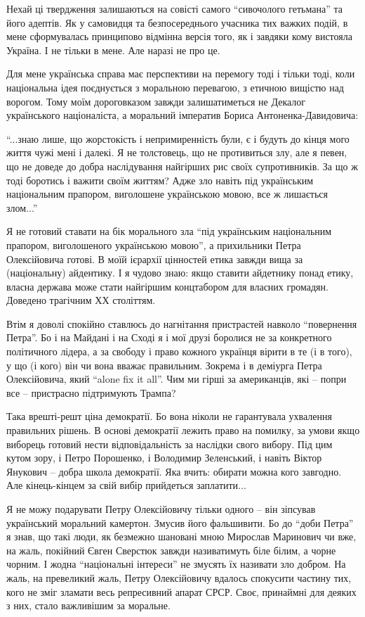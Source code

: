 Нехай ці твердження залишаються на совісті самого \enquote{сивочолого гетьмана}
та його адептів. Як у самовидця та безпосереднього учасника тих важких подій, в
мене сформувалась принципово відмінна версія того, як і завдяки кому вистояла
Україна. І не тільки в мене. Але наразі не про це.

Для мене українська справа має перспективи на перемогу тоді і тільки тоді, коли
національна ідея поєднується з моральною перевагою, з етичною вищістю над
ворогом. Тому моїм дороговказом завжди залишатиметься не Декалог українського
націоналіста, а моральний імператив Бориса Антоненка-Давидовича:

\begin{zzquote}
\enquote{...знаю лише, що жорстокість і непримиренність були, є і будуть до кінця мого
життя чужі мені і далекі. Я не толстовець, що не противиться злу, але я певен,
що не доведе до добра наслідування найгірших рис своїх супротивників. За що ж
тоді боротись і важити своїм життям? Адже зло навіть під українським
національним прапором, виголошене українською мовою, все ж лишається злом...}
\end{zzquote}

Я не готовий ставати на бік морального зла \enquote{під українським національним
прапором, виголошеного українською мовою}, а прихильники Петра Олексійовича
готові. В моїй ієрархії цінностей етика завжди вища за (національну) айдентику.
І я чудово знаю: якщо ставити айдетнику понад етику, власна держава може стати
найгіршим концтабором для власних громадян. Доведено трагічним ХХ століттям.

Втім я доволі спокійно ставлюсь до нагнітання пристрастей навколо
\enquote{повернення Петра}. Бо і на Майдані і на Сході я і мої друзі боролися
не за конкретного політичного лідера, а за свободу і право кожного українця
вірити в те (і в того), у що (і кого) він чи вона вважає правильним. Зокрема і
в деміурга Петра Олексійовича, який \enquote{alone fix it all}. Чим ми гірші за
американців, які – попри все – пристрасно підтримують Трампа?

Така врешті-решт ціна демократії. Бо вона ніколи не гарантувала ухвалення
правильних рішень. В основі демократії лежить право на помилку, за умови якщо
виборець готовий нести відповідальність за наслідки свого вибору. Під цим кутом
зору, і Петро Порошенко, і Володимир Зеленський, і навіть Віктор Янукович –
добра школа демократії. Яка вчить: обирати можна кого завгодно. Але
кінець-кінцем за свій вибір прийдеться заплатити...

Я не можу подарувати Петру Олексійовичу тільки одного – він зіпсував
український моральний камертон. Змусив його фальшивити. Бо до \enquote{доби Петра} я
знав, що такі люди, як безмежно шановані мною Мирослав Маринович чи вже, на
жаль, покійний Євген Сверстюк завжди називатимуть біле білим, а чорне чорним. І
жодна \enquote{національні інтереси} не змусять їх називати зло добром. На жаль, на
превеликий жаль, Петру Олексійовичу вдалось спокусити частину тих, кого не зміг
зламати весь репресивний апарат СРСР. Своє, принаймні для деяких з них, стало
важливішим за моральне.

